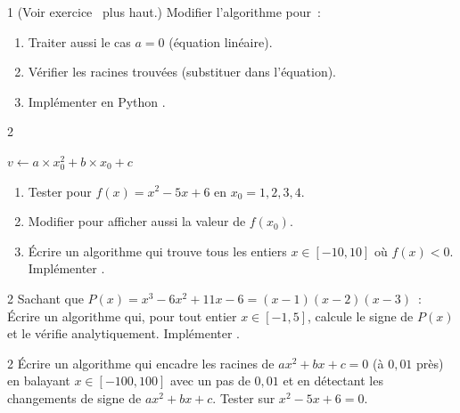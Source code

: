 \begin{bilan}
\begin{exo}[\algo\ Algorithme~: r\'esoudre $ax^2+bx+c=0$ \corrige]{1}
(Voir exercice \logicoalgo\ plus haut.)
Modifier l'algorithme pour~:
\begin{enumerate}
  \item Traiter aussi le cas $a=0$ (\'equation lin\'eaire).
  \item V\'erifier les racines trouv\'ees (substituer dans l'\'equation).
  \item Impl\'ementer en Python \computer.
\end{enumerate}
\end{exo}

\begin{exo}{2}

\begin{algorithm}[H]
\caption{Signe de $f(x)=ax^2+bx+c$}
$v \leftarrow a\times x_0^2 + b\times x_0 + c$\;
\end{algorithm}

\begin{enumerate}
  \item Tester pour $f(x)=x^2-5x+6$ en $x_0=1,2,3,4$.
  \item Modifier pour afficher aussi la valeur de $f(x_0)$.
  \item \'Ecrire un algorithme qui trouve tous les entiers $x\in[-10,10]$
        o\`u $f(x)<0$. Impl\'ementer \computer.
\end{enumerate}
\end{exo}

\begin{exo}{2}
Sachant que $P(x)=x^3-6x^2+11x-6=(x-1)(x-2)(x-3)$~:
\'Ecrire un algorithme qui, pour tout entier $x\in[-1,5]$,
calcule le signe de $P(x)$ et le v\'erifie analytiquement.
Impl\'ementer \computer.
\end{exo}

\begin{exo}{2}
\'Ecrire un algorithme qui encadre les racines de $ax^2+bx+c=0$ (\`a $0{,}01$ pr\`es)
en balayant $x\in[-100,100]$ avec un pas de $0{,}01$ et en d\'etectant les changements
de signe de $ax^2+bx+c$.
Tester sur $x^2-5x+6=0$.
\end{exo}


\end{bilan}
